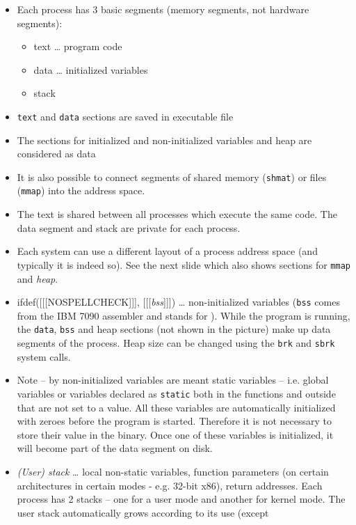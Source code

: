 \begin{itemize}
\item Each process has 3 basic segments (memory segments, not
hardware segments):
    \begin{itemize}
    \item text \dots{} program code
    \item data \dots{} initialized variables
    \item stack
    \end{itemize}
\item \texttt{text} and \texttt{data} sections are saved in executable file
\item The sections for initialized and non-initialized variables and heap are
considered as data
\item It is also possible to connect segments of shared memory
(\texttt{shmat}) or files (\texttt{mmap}) into the address space.
\item The text is shared between all processes which execute the same code.
The data segment and stack are private for each process.
\item Each system can use a different layout of a process address space
(and typically it is indeed so).  See the next slide which also shows
sections for \texttt{mmap} and \emph{heap}.
\item ifdef([[[NOSPELLCHECK]]], [[[\emph{bss}]]]) \dots{} non-initialized
variables (\texttt{bss} comes from the IBM 7090 assembler and stands for
).
While the program is running, the \texttt{data}, \texttt{bss} and heap
sections (not shown in the picture) make up data segments of the process.
Heap size can be changed using the \texttt{brk} and \texttt{sbrk} system calls.
\item Note -- by non-initialized variables are meant static variables --
i.e. global variables or variables declared as \texttt{static} both in the
functions and outside that are not set to a value.  All these variables are
automatically initialized with zeroes before the program is started. Therefore
it is not necessary to store their value in the binary. Once one of these
variables is initialized, it will become part of the data segment on disk.
\item \emph{(User) stack} \dots{} local non-static variables, function
parameters (on certain architectures in certain modes - e.g. 32-bit x86), return
addresses.  Each process has 2 stacks -- one for a user mode and another for
kernel mode.  The user stack automatically grows according to its use (except

\end{itemize}
